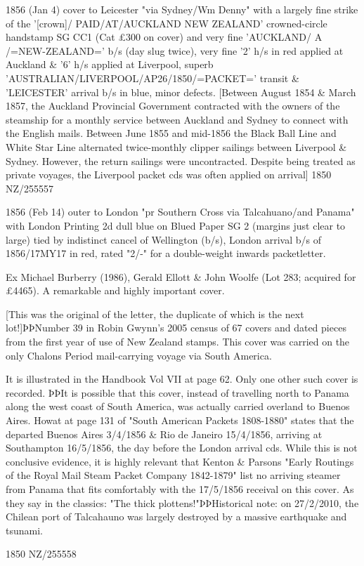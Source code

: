 \documentclass[justified]{tufte-book}
\begin{document}
%
{1856 (Jan 4) cover to Leicester "via Sydney/Wm Denny" with a largely fine strike of the '[crown]/ PAID/AT/AUCKLAND NEW ZEALAND' crowned-circle handstamp SG CC1 (Cat £300 on cover) and very fine 'AUCKLAND/ A /=NEW-ZEALAND=' b/s (day slug twice), very fine '2' h/s in red applied at Auckland \& '6' h/s applied at Liverpool, superb 'AUSTRALIAN/LIVERPOOL/AP26/1850/=PACKET=' transit \& 'LEICESTER' arrival b/s in blue, minor defects. [Between August 1854 \& March 1857, the Auckland Provincial Government contracted with the owners of the steamship  for a monthly service between Auckland and Sydney to connect with the English mails. Between June 1855 and mid-1856 the Black Ball Line and White Star Line alternated twice-monthly clipper sailings between Liverpool \& Sydney. However, the return sailings were uncontracted. Despite being treated as private voyages, the Liverpool packet cds was often applied on arrival]}%
{1850}%
{NZ/255557}%
{}%
{}
{}%
{}%

%
{1856 (Feb 14) outer to London "pr Southern Cross via Talcahuano/and Panama" with London Printing 2d dull blue on Blued Paper SG 2 (margins just clear to large) tied by indistinct cancel of Wellington (b/s), London arrival b/s of 1856/17MY17 in red, rated "2/-" for a double-weight inwards packetletter. 

Ex Michael Burberry (1986), Gerald Ellott \& John Woolfe (Lot 283; acquired for £4465). A remarkable and highly important cover. 

[This was the original of the letter, the duplicate of which is the next lot!]ÞÞNumber 39 in Robin Gwynn's 2005 census of 67 covers and dated pieces from the first year of use of New Zealand stamps. This cover was carried on the only Chalons Period mail-carrying voyage via South America. 

It is illustrated in the Handbook Vol VII at page 62. Only one other such cover is recorded. ÞÞIt is possible that this cover, instead of travelling north to Panama along the west coast of South America, was actually carried overland to Buenos Aires. Howat at page 131 of "South American Packets 1808-1880" states that the  departed Buenos Aires 3/4/1856 \& Rio de Janeiro 15/4/1856, arriving at Southampton 16/5/1856, the day before the London arrival cds. While this is not conclusive evidence, it is highly relevant that Kenton \& Parsons "Early Routings of the Royal Mail Steam Packet Company 1842-1879" list no arriving steamer from Panama that fits comfortably with the 17/5/1856 receival on this cover. As they say in the classics: "The thick plottens!"ÞÞHistorical note: on 27/2/2010, the Chilean port of Talcahauno was largely destroyed by a massive earthquake and tsunami.}%
{1850}%
{NZ/255558}%
{}%
{}
{}%
{}%
\end{document}
